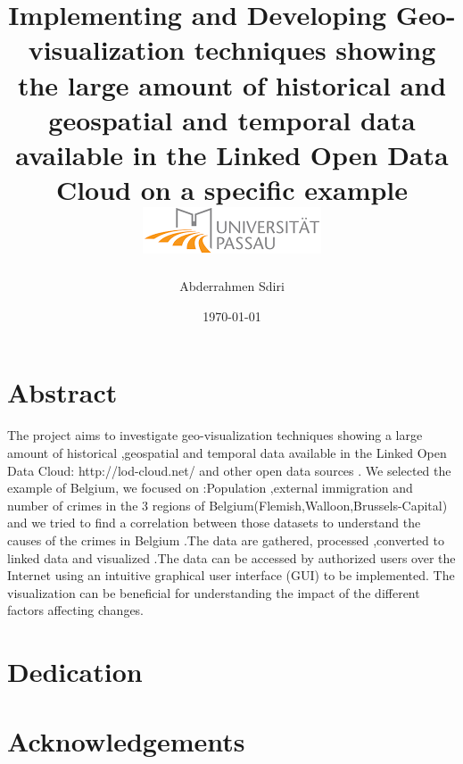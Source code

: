 \documentclass[a4paper,12pt,oneside]{report}
\begin{document}
\title{
{ Implementing and Developing Geo-visualization techniques showing the large amount of historical and geospatial and temporal data available in the Linked Open Data Cloud on a specific example }\\
{\includegraphics{university.png}}}
\author{Abderrahmen Sdiri}
\date{\today}
\maketitle
\chapter*{Abstract}
{The project aims to investigate geo-visualization techniques showing a large amount of historical ,geospatial and temporal data available in the Linked Open Data Cloud: http://lod-cloud.net/ and other open data sources . We selected the example of Belgium, we focused on :Population ,external immigration and number of  crimes  in the 3 regions of Belgium(Flemish,Walloon,Brussels-Capital) and we tried to find a  correlation between those datasets to understand the causes of the crimes in Belgium .The data are gathered, processed ,converted to linked data  and visualized .The data  can be accessed by authorized users over the Internet using an intuitive graphical user interface (GUI) to be implemented. The visualization can be beneficial for understanding the impact of the different factors affecting changes.}
\chapter*{Dedication}
\chapter*{Acknowledgements}
\tableofcontents
\listoffigures
\listoftables
\newpage
{}
\end{document}
